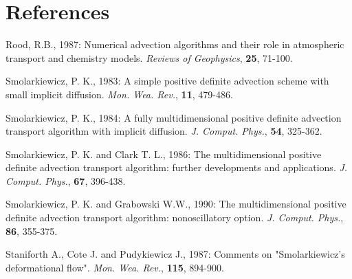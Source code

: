 \section{References}

\parindent 0cm

Rood, R.B., 1987: Numerical advection algorithms and their role in
atmospheric transport and chemistry models.
{\it Reviews of Geophysics},  {\bf 25}, 71-100.
\por

Smolarkiewicz, P. K., 1983: A simple positive definite advection scheme with
small implicit diffusion.
{\it Mon. Wea. Rev.},  {\bf 11}, 479-486.
\por

Smolarkiewicz, P. K., 1984: A fully multidimensional positive definite advection
transport algorithm with implicit diffusion.
{\it J. Comput. Phys.},  {\bf 54}, 325-362.
\por

Smolarkiewicz, P. K. and Clark T. L., 1986: The multidimensional positive definite
advection
transport algorithm: further developments and applications.
{\it J. Comput. Phys.},  {\bf 67}, 396-438.
\por

Smolarkiewicz, P. K. and Grabowski W.W., 1990: The multidimensional
positive definite
advection
transport algorithm: nonoscillatory option.
{\it J. Comput. Phys.},  {\bf 86}, 355-375.
\por

Staniforth A., Cote J. and Pudykiewicz J., 1987: Comments on "Smolarkiewicz's
deformational flow". {\it Mon. Wea. Rev.},  {\bf 115}, 894-900.
\por


